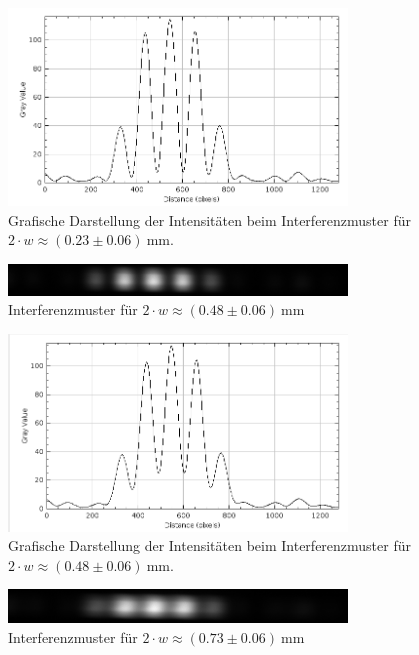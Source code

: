 \documentclass{article}
\begin{document}
\begin{figure}[H]
\centering
\caption{Grafische Darstellung der Intensitäten beim Interferenzmuster für $2\cdot w \approx (0.23\pm0.06)~$mm.}
\includegraphics[width=9cm]{moodle/img2_graph.png}
\end{figure}



\begin{figure}[H]
\centering
\caption{Interferenzmuster für $2\cdot w \approx (0.48\pm0.06)~$mm}
\includegraphics[width=9cm]{moodle/img3.png}
\end{figure}

\begin{figure}[H]
\centering
\caption{Grafische Darstellung der Intensitäten beim Interferenzmuster für $2\cdot w \approx (0.48\pm0.06)~$mm.}
\includegraphics[width=9cm]{moodle/img3_graph.png}
\end{figure}



\begin{figure}[H]
\centering
\caption{Interferenzmuster für $2\cdot w \approx (0.73\pm0.06)~$mm}
\includegraphics[width=9cm]{moodle/img4.png}
\end{figure}
\end{document}
